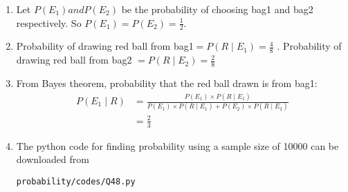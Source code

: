 \renewcommand{\theequation}{\theenumi}
\begin{enumerate}[label=\thesection.\arabic*.,ref=\thesection.\theenumi]
\item Let $P(E_1) and P(E_2)$ be the probability of choosing bag1 and bag2 respectively. So $P(E_1)= P(E_2) = \frac{1}{2}$.
\item Probability of drawing red ball from bag1$ = P(R \mid E_1) = \frac{4}{8}$ . Probability of drawing red ball from bag2 $ = P(R \mid E_2) = \frac{2}{8}$
\item From Bayes theorem, probability that the red ball drawn is from bag1:
\begin{align}
P(E_1 \mid R) &= \frac{P(E_1)\times P(R \mid E_1)}{P(E_1)\times P(R \mid E_1) + P(E_2)\times P(R \mid E_2)}\\
&= \frac{2}{3}
\end{align}
\item The python code for finding probability using a sample size of 10000 can be downloaded from
\begin{lstlisting}
probability/codes/Q48.py
\end{lstlisting}
\end{enumerate}